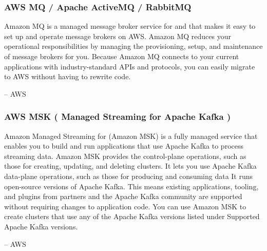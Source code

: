 \documentclass{csse4400}
\begin{document}
\subsubsection{AWS MQ / Apache ActiveMQ / RabbitMQ}
\begin{oldquote}
Amazon MQ is a managed message broker service for  and
 that makes it easy to set up and operate message brokers on AWS.
Amazon MQ reduces your operational responsibilities by managing the provisioning, setup, and maintenance of message brokers for you.
Because Amazon MQ connects to your current applications with industry-standard APIs and protocols,
you can easily migrate to AWS without having to rewrite code.

\raggedleft -- AWS
\end{oldquote}


\subsubsection{AWS MSK ( Managed Streaming for Apache Kafka )}
\begin{oldquote}
Amazon Managed Streaming for  (Amazon MSK) is a fully managed service
that enables you to build and run applications that use Apache Kafka to process streaming data.
Amazon MSK provides the control-plane operations, such as those for creating, updating, and deleting clusters.
It lets you use Apache Kafka data-plane operations,
such as those for producing and consuming data
It runs open-source versions of Apache Kafka.
This means existing applications, tooling, and plugins from partners and the Apache Kafka community are supported without requiring changes to application code.
You can use Amazon MSK to create clusters that use any of the Apache Kafka versions listed under Supported Apache Kafka versions.

\raggedleft -- AWS
\end{oldquote}

\end{document}
